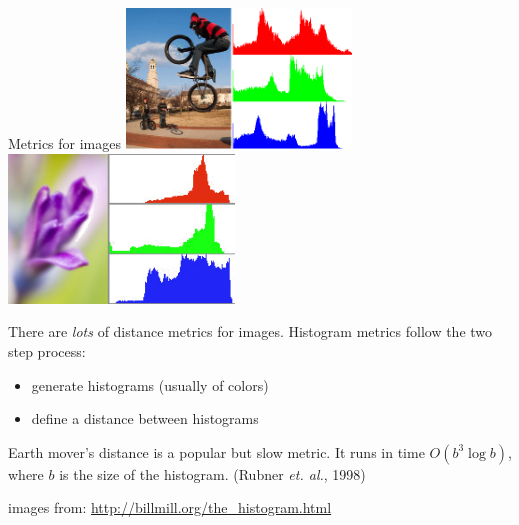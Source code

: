 \begin{frame}[fragile]{Metrics for images}
\includegraphics[width=6cm]{slides/covertree/imagehistogram2.png}
\includegraphics[width=6cm]{slides/covertree/imagehistogram3b.jpg}

\vspace{0.15in}
There are \emph{lots} of distance metrics for images.
Histogram metrics follow the two step process:
\begin{itemize}
\item generate histograms (usually of colors)
\item define a distance between histograms
\end{itemize}

Earth mover's distance is a popular but slow metric.
It runs in time $O(b^3 \log b)$, where $b$ is the size of the histogram.
(Rubner \emph{et. al.}, 1998)

\vspace{0.05in}
{\tiny
images from: \url{http://billmill.org/the_histogram.html}
}
\end{frame}


%
